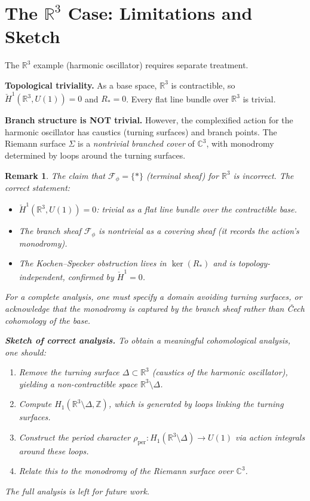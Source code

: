 \documentclass[11pt]{article}
\newtheorem{remark}[theorem]{Remark}
\begin{document}
\section{The $\mathbb{R}^3$ Case: Limitations and Sketch}
\label{sec:R3}

The $\mathbb{R}^3$ example (harmonic oscillator) requires separate treatment.

\textbf{Topological triviality.} As a base space, $\mathbb{R}^3$ is
contractible, so $\check{H}^1(\mathbb{R}^3, U(1)) = 0$ and $R_* = 0$.
Every flat line bundle over $\mathbb{R}^3$ is trivial.

\textbf{Branch structure is NOT trivial.} However, the complexified action
for the harmonic oscillator has caustics (turning surfaces) and branch
points. The Riemann surface $\Sigma$ is a \emph{nontrivial branched cover}
of $\mathbb{C}^3$, with monodromy determined by loops around the turning
surfaces.

\begin{remark}
The claim that $\mathcal{F}_\phi = \{*\}$ (terminal sheaf) for $\mathbb{R}^3$
is incorrect. The correct statement:
\begin{itemize}
  \item $\check{H}^1(\mathbb{R}^3, U(1)) = 0$: trivial as a flat line bundle
        over the contractible base.
  \item The branch sheaf $\mathcal{F}_\phi$ is \emph{nontrivial} as a
        covering sheaf (it records the action's monodromy).
  \item The Kochen--Specker obstruction lives in $\ker(R_*)$ and is
        \emph{topology-independent}, confirmed by $\check{H}^1 = 0$.
\end{itemize}
For a complete analysis, one must specify a domain avoiding turning
surfaces, or acknowledge that the monodromy is captured by the branch
sheaf rather than Čech cohomology of the base.

\textbf{Sketch of correct analysis.} To obtain a meaningful cohomological analysis, one should:
\begin{enumerate}
  \item Remove the turning surface $\Delta \subset \mathbb{R}^3$ (caustics of the harmonic oscillator), yielding a non-contractible space $\mathbb{R}^3 \setminus \Delta$.
  \item Compute $H_1(\mathbb{R}^3 \setminus \Delta, \mathbb{Z})$, which is generated by loops linking the turning surfaces.
  \item Construct the period character $\rho_{\mathrm{per}}: H_1(\mathbb{R}^3 \setminus \Delta) \to U(1)$ via action integrals around these loops.
  \item Relate this to the monodromy of the Riemann surface over $\mathbb{C}^3$.
\end{enumerate}
The full analysis is left for future work.
\end{remark}
\end{document}
